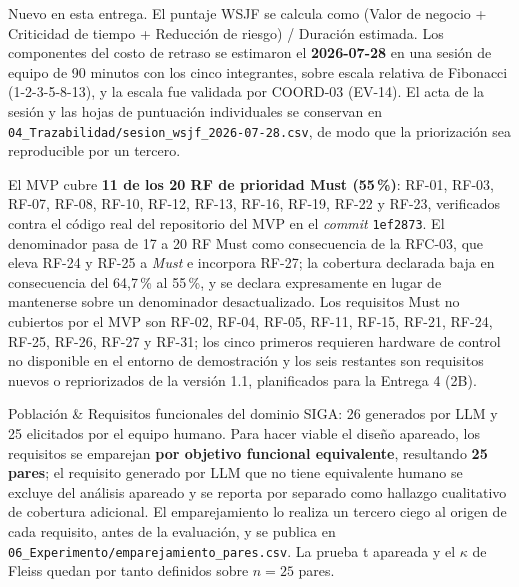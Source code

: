 Nuevo en esta entrega. El puntaje WSJF se calcula como (Valor de negocio + Criticidad de tiempo + Reducci\'on de riesgo) / Duraci\'on estimada. Los componentes del costo de retraso se estimaron el \textbf{2026-07-28} en una sesi\'on de equipo de 90 minutos con los cinco integrantes, sobre escala relativa de Fibonacci (1-2-3-5-8-13), y la escala fue validada por COORD-03 (EV-14). El acta de la sesi\'on y las hojas de puntuaci\'on individuales se conservan en \texttt{04\_Trazabilidad/sesion\_wsjf\_2026-07-28.csv}, de modo que la priorizaci\'on sea reproducible por un tercero.

El MVP cubre \textbf{11 de los 20 RF de prioridad Must (55\,\%)}: RF-01, RF-03, RF-07, RF-08, RF-10, RF-12, RF-13, RF-16, RF-19, RF-22 y RF-23, verificados contra el c\'odigo real del repositorio del MVP en el \emph{commit} \texttt{1ef2873}. El denominador pasa de 17 a 20 RF Must como consecuencia de la RFC-03, que eleva RF-24 y RF-25 a \emph{Must} e incorpora RF-27; la cobertura declarada baja en consecuencia del 64,7\,\% al 55\,\%, y se declara expresamente en lugar de mantenerse sobre un denominador desactualizado. Los requisitos Must no cubiertos por el MVP son RF-02, RF-04, RF-05, RF-11, RF-15, RF-21, RF-24, RF-25, RF-26, RF-27 y RF-31; los cinco primeros requieren hardware de control no disponible en el entorno de demostraci\'on y los seis restantes son requisitos nuevos o repriorizados de la versi\'on 1.1, planificados para la Entrega 4 (2B).

Poblaci\'on & Requisitos funcionales del dominio SIGA: 26 generados por LLM y 25 elicitados por el equipo humano. Para hacer viable el dise\~no apareado, los requisitos se emparejan \textbf{por objetivo funcional equivalente}, resultando \textbf{25 pares}; el requisito generado por LLM que no tiene equivalente humano se excluye del an\'alisis apareado y se reporta por separado como hallazgo cualitativo de cobertura adicional. El emparejamiento lo realiza un tercero ciego al origen de cada requisito, antes de la evaluaci\'on, y se publica en \texttt{06\_Experimento/emparejamiento\_pares.csv}. La prueba t apareada y el $\kappa$ de Fleiss quedan por tanto definidos sobre $n=25$ pares. \\ \hline

